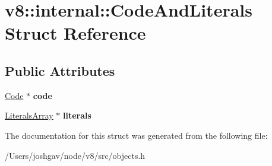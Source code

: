 \hypertarget{structv8_1_1internal_1_1_code_and_literals}{}\section{v8\+:\+:internal\+:\+:Code\+And\+Literals Struct Reference}
\label{structv8_1_1internal_1_1_code_and_literals}
\subsection*{Public Attributes}
\begin{DoxyCompactItemize}
\item 
\hyperlink{classv8_1_1internal_1_1_code}{Code} $\ast$ {\bfseries code}\hypertarget{structv8_1_1internal_1_1_code_and_literals_acba53a019056bf38bd7d577a0e0bbfb9}{}\label{structv8_1_1internal_1_1_code_and_literals_acba53a019056bf38bd7d577a0e0bbfb9}

\item 
\hyperlink{classv8_1_1internal_1_1_literals_array}{Literals\+Array} $\ast$ {\bfseries literals}\hypertarget{structv8_1_1internal_1_1_code_and_literals_a829c6454a1c7a64cb5ba967d0d7b6ee5}{}\label{structv8_1_1internal_1_1_code_and_literals_a829c6454a1c7a64cb5ba967d0d7b6ee5}

\end{DoxyCompactItemize}


The documentation for this struct was generated from the following file\+:\begin{DoxyCompactItemize}
\item 
/\+Users/joshgav/node/v8/src/objects.\+h\end{DoxyCompactItemize}
